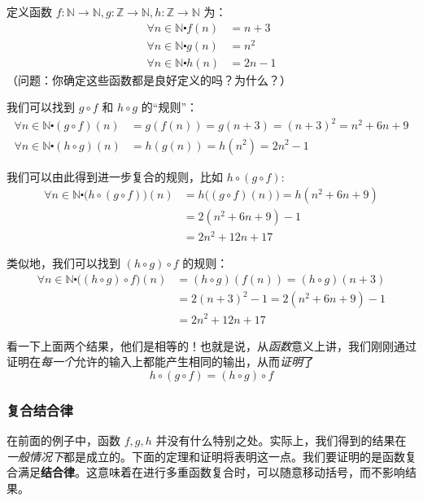 \begin{example}
    定义函数 $f : \mathbb{N} \to \mathbb{N}, g : \mathbb{Z} \to \mathbb{N}, h : \mathbb{Z} \to \mathbb{N}$ 为：
    \begin{align*}
        \forall n \in \mathbb{N} \centerdot f(n) &= n + 3 \\
        \forall n \in \mathbb{N} \centerdot g(n) &= n^2 \\
        \forall n \in \mathbb{N} \centerdot h(n) &= 2n - 1
    \end{align*}
    （问题：你确定这些函数都是良好定义的吗？为什么？）

    我们可以找到 $g \circ f$ 和 $h \circ g$ 的``规则''：
    \begin{align*}
        \forall n \in \mathbb{N} \centerdot (g \circ f)(n) &= g(f(n)) = g(n + 3) = (n + 3)^2 = n^2 + 6n + 9 \\
        \forall n \in \mathbb{N} \centerdot (h \circ g)(n) &= h(g(n)) = h(n^2) = 2n^2-1
    \end{align*}

    我们可以由此得到进一步复合的规则，比如 $h \circ (g \circ f)$:
    \begin{align*}
        \forall n \in \mathbb{N} \centerdot \big(h \circ (g \circ f)\big)(n) &= h\big((g \circ f)(n)\big) = h(n^2 + 6n + 9) \\
        &= 2(n^2 + 6n + 9) - 1 \\
        &= 2n^2 + 12n + 17
    \end{align*}

    类似地，我们可以找到 $(h \circ g) \circ f$ 的规则：
    \begin{align*}
        \forall n \in \mathbb{N} \centerdot \big((h \circ g) \circ f\big)(n) &= (h \circ g)(f(n)) = (h \circ g)(n + 3) \\
        &= 2(n + 3)^2 - 1 = 2(n^2 + 6n + 9) - 1 \\
        &= 2n^2 + 12n + 17
    \end{align*}
\end{example}

看一下上面两个结果，他们是相等的！也就是说，从\emph{函数}意义上讲，我们刚刚通过证明在\emph{每一个}允许的输入上都能产生相同的输出，从而\emph{证明}了
\[h \circ (g \circ f) = (h \circ g) \circ f\]

\subsubsection*{复合结合律}

在前面的例子中，函数 $f, g, h$ 并没有什么特别之处。实际上，我们得到的结果在\emph{一般情况下}都是成立的。下面的定理和证明将表明这一点。我们要证明的是函数复合满足\textbf{结合律}。这意味着在进行多重函数复合时，可以随意移动括号，而不影响结果。

